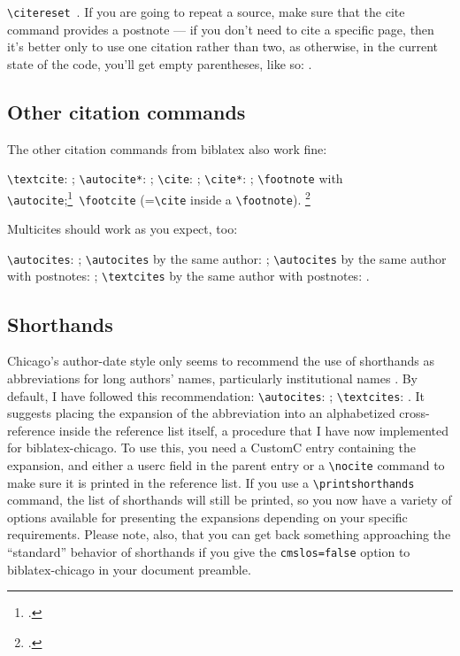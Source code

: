 \documentclass[a4paper,12pt]{report}
\newcommand{\cmd}[1]{\texttt{\textbackslash #1}}
\begin{document}
\citereset\cmd{citereset}\ \autocite[16.115]{chicago:manual:15}.  If
you are going to repeat a source, make sure that the cite command
provides a postnote --- if you don't need to cite a specific page,
then it's better only to use one citation rather than two, as
otherwise, in the current state of the code, you'll get empty
parentheses, like so: \autocite{chicago:manual:15}.

\subsection*{Other citation commands}
\label{sec:other}

The other citation commands from \textsf{biblatex} also work fine:

\cmd{textcite}: \textcite{conley:fifthgrade}; \cmd{autocite*}:
\autocite*{connell:chronic}; \cmd{cite}: \cite{conway:evolution};
\cmd{cite*}: \cite*{davenport:attention}; \cmd{foot\-note} with
\cmd{autocite};\footnote{\autocite{donne:var:15}.}\ \cmd{footcite}
(=\cmd{cite} inside a \cmd{footnote}).  \footcite{dunn:revolutions}

Multicites should work as you expect, too:

\cmd{autocites}: \autocites{dyna:browser}{eliot:pound};
\cmd{autocites} by the same author:
\autocites{pirumova}{pirumova:russian}; \cmd{autocites} by the same
author with postnotes: \autocites{pirumova}[14]{pirumova:russian};
\cmd{textcites} by the same author with postnotes:
\textcites[37]{pirumova}{pirumova:russian}.

\subsection*{Shorthands}
\label{sec:shorthands}

Chicago's author-date style only seems to recommend the use of
shorthands as abbreviations for long authors' names, particularly
institutional names \autocite[17.47]{chicago:manual:15}.  By default, I
have followed this recommendation: \cmd{autocites}:
\autocites{bsi:abbreviation:15}{iso:electrodoc:15}; \cmd{textcites}:
\textcites{bsi:abbreviation:15}{iso:electrodoc:15}.  It suggests
placing the expansion of the abbreviation into an alphabetized
cross-reference inside the reference list itself, a procedure that I
have now implemented for \textsf{biblatex-chicago}.  To use this, you
need a \textsf{CustomC} entry containing the expansion, and either a
\textsf{userc} field in the parent entry or a \cmd{nocite} command to
make sure it is printed in the reference list.  If you use a
\cmd{printshorthands} command, the list of shorthands will still be
printed, so you now have a variety of options available for presenting
the expansions depending on your specific requirements.  Please note,
also, that you can get back something approaching the
\enquote{standard} behavior of shorthands if you give the
\texttt{cmslos=false} option to \textsf{biblatex-chicago} in your
document preamble.
\end{document}
